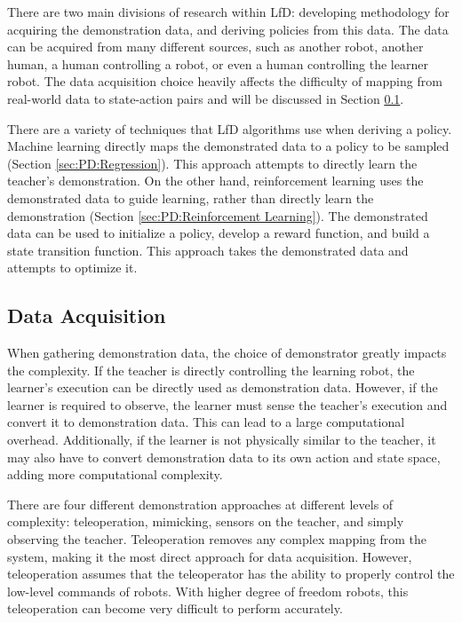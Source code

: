 \documentclass{article}
\begin{document}
There are two main divisions of research within LfD: developing methodology for acquiring the demonstration data, and deriving policies from this data. The data can be acquired from many different sources, such as another robot, another human, a human controlling a robot, or even a human controlling the learner robot. The data acquisition choice heavily affects the difficulty of mapping from real-world data to state-action pairs and will be discussed in Section \ref{sec:Data Acquisition}. 

There are a variety of techniques that LfD algorithms use when deriving a policy. Machine learning directly maps the demonstrated data to a policy to be sampled (Section \ref{sec:PD:Regression}). This approach attempts to directly learn the teacher's demonstration. On the other hand, reinforcement learning uses the demonstrated data to guide learning, rather than directly learn the demonstration (Section \ref{sec:PD:Reinforcement Learning}). The demonstrated data can be used to initialize a policy, develop a reward function, and build a state transition function. This approach takes the demonstrated data and attempts to optimize it.  


\subsection{Data Acquisition} \label{sec:Data Acquisition}
When gathering demonstration data, the choice of demonstrator greatly impacts the complexity. If the teacher is directly controlling the learning robot, the learner's execution can be directly used as demonstration data. However, if the learner is required to observe, the learner must sense the teacher's execution and convert it to demonstration data. This can lead to a large computational overhead. Additionally, if the learner is not physically similar to the teacher, it may also have to convert demonstration data to its own action and state space, adding more computational complexity.

There are four different demonstration approaches at different levels of complexity: teleoperation, mimicking, sensors on the teacher, and simply observing the teacher. Teleoperation removes any complex mapping from the system, making it the most direct approach for data acquisition. However, teleoperation assumes that the teleoperator has the ability to properly control the low-level commands of robots. With higher degree of freedom robots, this teleoperation can become very difficult to perform accurately. 
\end{document}
